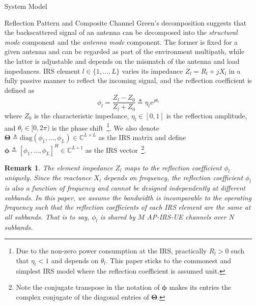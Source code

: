 \documentclass[journal]{IEEEtran}
\newtheorem{remark}{Remark}
\begin{document}
\begin{section}{System Model}
		\begin{subsection}{Reflection Pattern and Composite Channel}
			Green's decomposition \cite{Hansen1989} suggests that the backscattered signal of an antenna can be decomposed into the \emph{structural mode} component and the \emph{antenna mode} component. The former is fixed for a given antenna and can be regarded as part of the environment multipath, while the latter is adjustable and depends on the mismatch of the antenna and load impedances. IRS element $l \in \{1, \dots, L\}$ varies its impedance $Z_l = R_l + j X_l$ in a fully passive manner to reflect the incoming signal, and the reflection coefficient is defined as
			\begin{equation}
				\phi_l = \frac{Z_l - Z_0}{Z_l + Z_0} \triangleq \eta_l e^{j\theta_l}
			\end{equation}
			where $Z_0$ is the characteristic impedance, $\eta_l \in [0, 1]$ is the reflection amplitude, and $\theta_l \in [0,2\pi)$ is the phase shift~\footnote{Due to the non-zero power consumption at the IRS, practically $R_l > 0$ such that $\eta_l < 1$ and depends on $\theta_l$. This paper sticks to the commonest and simplest IRS model where the reflection coefficient is assumed unit.}. We also denote $\boldsymbol{\Theta} \triangleq \mathrm{diag}(\phi_1, \dots, \phi_L) \in \mathbb{C}^{L \times L}$ as the IRS matrix and define $\boldsymbol{\phi} \triangleq [\phi_1, \dots, \phi_L]^H \in \mathbb{C}^{L \times 1}$ as the IRS vector~\footnote{Note the conjugate transpose in the notation of $\boldsymbol{\phi}$ makes its entries the complex conjugate of the diagonal entries of $\boldsymbol{\Theta}$.}.

			\begin{remark}\label{re:reflection_coefficient}
				The element impedance $Z_l$ maps to the reflection coefficient $\phi_l$ uniquely. Since the reactance $X_l$ depends on frequency, the reflection coefficient $\phi_l$ is also a function of frequency and cannot be designed independently at different subbands. In this paper, we assume the bandwidth is incomparable to the operating frequency such that the reflection coefficients of each IRS element are the same at all subbands. That is to say, $\phi_l$ is shared by $M$ AP-IRS-UE channels over $N$ subbands.
			\end{remark}


\end{subsection}
\end{section}
\end{document}
